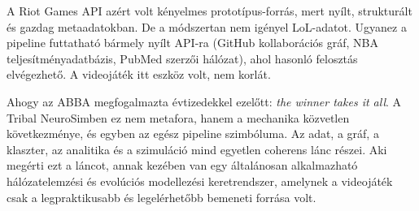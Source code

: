 A Riot Games API azért volt kényelmes prototípus-forrás, mert nyílt, strukturált és gazdag
metaadatokban. De a módszertan nem igényel LoL-adatot. Ugyanez a pipeline futtatható bármely
nyílt API-ra (GitHub kollaborációs gráf, NBA teljesítményadatbázis, PubMed szerzői hálózat),
ahol hasonló felosztás elvégezhető. A videojáték itt eszköz volt, nem korlát.

Ahogy az ABBA megfogalmazta évtizedekkel ezelőtt: \textit{the winner takes it all}.
A Tribal NeuroSimben ez nem metafora, hanem a mechanika közvetlen következménye, és egyben
az egész pipeline szimbóluma. Az adat, a gráf, a klaszter, az analitika és a szimuláció mind
egyetlen coherens lánc részei. Aki megérti ezt a láncot, annak kezében van egy általánosan
alkalmazható hálózatelemzési és evolúciós modellezési keretrendszer, amelynek a videojáték
csak a legpraktikusabb és legelérhetőbb bemeneti forrása volt.
